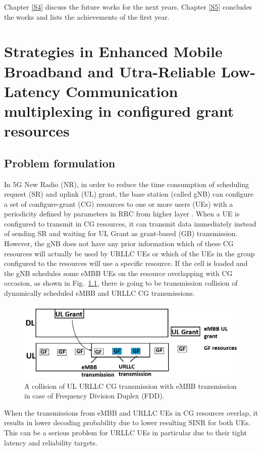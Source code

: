 \documentclass{report}
\begin{document}
Chapter \ref{S4} discuss the future works for the next years. Chapter \ref{S5} concludes the works and lists the achievements of the first year.


\chapter{Strategies in Enhanced Mobile Broadband and Utra-Reliable Low-Latency Communication multiplexing in configured grant resources} \label{S2}

\section{Problem formulation}

In 5G New Radio (NR),  in order to reduce the time consumption of scheduling request (SR) and uplink (UL) grant, the base station (called gNB) can configure a set of configure-grant (CG) resources to one or more users (UEs) with a periodicity defined by parameters in RRC from higher layer \cite{ad3}. When a UE is configured to transmit in CG resources, it can transmit data immediately instead of sending SR and waiting for UL Grant as grant-based (GB) transmission. However, the gNB does not have any prior information which of these CG resources will actually be used by URLLC UEs or which of the UEs in the group configured to the resources will use a specific resource. If the cell is loaded and the gNB schedules some eMBB UEs on the resource overlapping with CG occasion, as shown in Fig.~\ref{fig1}, there is going to be transmission collision of dynamically scheduled eMBB and URLLC CG transmissions. 

\begin{figure}[htbp]
\centerline{\includegraphics[scale=0.3]{fig1.PNG}}
\caption{A collision of UL URLLC CG transmission with eMBB transmission in case of Frequency Division Duplex (FDD).}
\label{fig1}
\end{figure}

When the transmissions from eMBB and URLLC UEs in CG resources overlap, it results in lower decoding probability due to lower resulting SINR for both UEs. This can be a serious problem for URLLC UEs in particular due to their tight latency and reliability targets.
\end{document}
